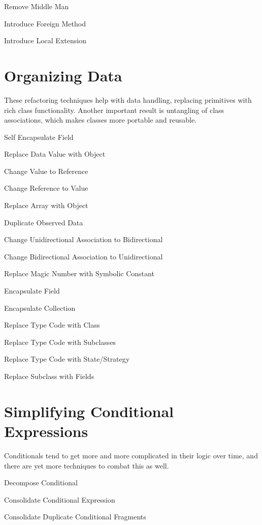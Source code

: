 \documentclass[11pt,a4paper,oneside]{book}
\begin{document}
    Remove Middle Man
    
    Introduce Foreign Method
    
    Introduce Local Extension



\section{Organizing Data}

These refactoring techniques help with data handling, replacing primitives with rich class functionality. Another important result is untangling of class associations, which makes classes more portable and reusable.

    Self Encapsulate Field
    
    Replace Data Value with Object
    
    Change Value to Reference
    
    Change Reference to Value
    
    Replace Array with Object
    
    Duplicate Observed Data
    
    Change Unidirectional Association to Bidirectional
    
    Change Bidirectional Association to Unidirectional
    
    Replace Magic Number with Symbolic Constant
    
    Encapsulate Field
    
    Encapsulate Collection
    
    Replace Type Code with Class
    
    Replace Type Code with Subclasses
    
    Replace Type Code with State/Strategy
    
    Replace Subclass with Fields




\section{Simplifying Conditional Expressions}

Conditionals tend to get more and more complicated in their logic over time, and there are yet more techniques to combat this as well.

    Decompose Conditional
    
    Consolidate Conditional Expression
    
    Consolidate Duplicate Conditional Fragments
    
\end{document}
